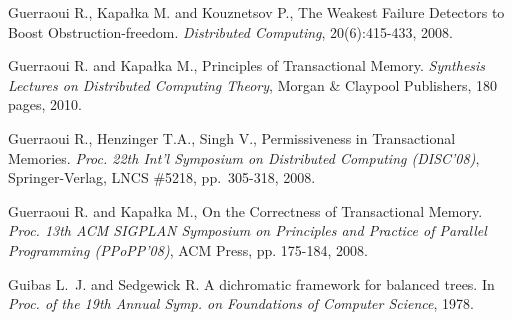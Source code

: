 \begin{thebibliography}{99}
{%
Guerraoui R., Kapa\l{}ka M. and  Kouznetsov P., 
The Weakest Failure Detectors to Boost Obstruction-freedom. 
{\it Distributed Computing}, 20(6):415-433, 2008. 


Guerraoui R. and  Kapa\l{}ka M.,
Principles of Transactional Memory. 
{\it Synthesis Lectures on Distributed Computing Theory},
 Morgan \& Claypool Publishers, 180 pages, 2010. 




Guerraoui R., Henzinger T.A., Singh V.,
Permissiveness  in Transactional Memories. 
{\em Proc. 22th Int'l Symposium on Distributed Computing (DISC'08)},
Springer-Verlag, LNCS \#5218, pp.~305-318, 2008.


% 
% 




Guerraoui R. and Kapa\l{}ka M., 
On the Correctness of Transactional Memory. 
{\it Proc. 13th ACM SIGPLAN Symposium on Principles and Practice of 
Parallel Programming (PPoPP'08)}, ACM Press, pp. 175-184, 2008. 






Guibas L.~J.  and Sedgewick R.
\newblock A dichromatic framework for balanced trees.
\newblock In {\em Proc. of the 19th Annual Symp. on Foundations of Computer
  Science}, 1978.

}
\end{thebibliography}
